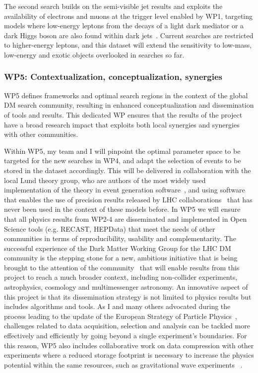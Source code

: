 \documentclass[11pt,a4paper]{article}
\begin{document}
The second search builds on the semi-visible jet results and exploits the availability of electrons and muons at the trigger level enabled by WP1, targeting models where low-energy leptons from the decays of a light dark mediator or a dark Higgs boson are also found within dark jets~\cite{Curtin:2014cca,Falkowski:2010gv}. %
Current searches are restricted to higher-energy leptons, and this dataset will extend the sensitivity to low-mass, low-energy and exotic objects overlooked in searches so far. 

\subsubsection*{WP5: Contextualization, conceptualization, synergies}

WP5 defines frameworks and optimal search regions in the context of the global DM search community, resulting in enhanced conceptualization and dissemination of tools and results.
This dedicated WP ensures that the results of the project have a broad research impact that exploits both local synergies and synergies with other communities. 

Within WP5, my team and I will pinpoint the optimal parameter space to be targeted for the new searches in WP4, and adapt the selection of events to be stored in the dataset accordingly. This will be delivered in collaboration with the local Lund theory group, who are authors of the most widely used implementation of the theory in event generation software~\cite{Sjostrand:2007gs}, and using software that enables the use of precision results released by LHC collaborations~\cite{Butterworth:2016sqg} that has never been used in the context of these models before. 
In WP5 we will ensure that all physics results from WP2-4 are disseminated and implemented in Open Science tools (e.g. RECAST, HEPData) that meet the needs of other communities in terms of reproducibility, usability and complementarity. The successful experience of the Dark Matter Working Group for the LHC DM community is the stepping stone for a new, ambitious initiative that is being brought to the attention of the community~\cite{iDMEu} that will enable results from this project to reach a much broader context, including non-collider experiments, astrophysics, cosmology and multimessenger astronomy. 
An innovative aspect of this project is that its dissemination strategy is not limited to physics results but includes algorithms and tools. 
As I and many others advocated during the process leading to the update of the European Strategy of Particle Physics~\cite{Doglioni:2019fza}, challenges related to data acquisition, selection and analysis can be tackled more effectively and efficiently by going beyond a single experiment's boundaries. 
For this reason, WP5 also includes collaborative work on data compression with other experiments where a reduced storage footprint is necessary to increase the physics potential within the same resources, such as gravitational wave experiments \color{red}~\cite{GravWavesCompression}\color{black}. 
\end{document}
